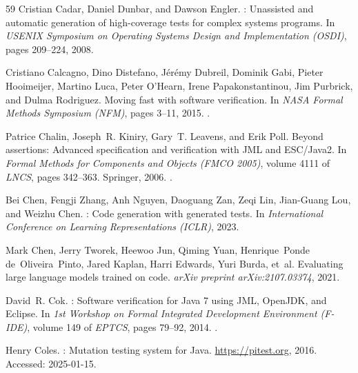 \documentclass[11pt]{article}
\begin{document}
\begin{thebibliography}{59}
Cristian Cadar, Daniel Dunbar, and Dawson Engler.
: Unassisted and automatic generation of high-coverage tests
  for complex systems programs.
\newblock In \emph{USENIX Symposium on Operating Systems Design and
  Implementation (OSDI)}, pages 209--224, 2008.

Cristiano Calcagno, Dino Distefano, J{\'e}r{\'e}my Dubreil, Dominik Gabi,
  Pieter Hooimeijer, Martino Luca, Peter O'Hearn, Irene Papakonstantinou, Jim
  Purbrick, and Dulma Rodriguez.
\newblock Moving fast with software verification.
\newblock In \emph{NASA Formal Methods Symposium (NFM)}, pages 3--11, 2015.
\newblock {}.

Patrice Chalin, Joseph~R. Kiniry, Gary~T. Leavens, and Erik Poll.
\newblock Beyond assertions: Advanced specification and verification with {JML}
  and {ESC/Java2}.
\newblock In \emph{Formal Methods for Components and Objects (FMCO 2005)},
  volume 4111 of \emph{LNCS}, pages 342--363. Springer, 2006.
\newblock {}.

Bei Chen, Fengji Zhang, Anh Nguyen, Daoguang Zan, Zeqi Lin, Jian-Guang Lou, and
  Weizhu Chen.
: Code generation with generated tests.
\newblock In \emph{International Conference on Learning Representations
  (ICLR)}, 2023.

Mark Chen, Jerry Tworek, Heewoo Jun, Qiming Yuan, Henrique~Ponde
  de~Oliveira~Pinto, Jared Kaplan, Harri Edwards, Yuri Burda, et~al.
\newblock Evaluating large language models trained on code.
\newblock \emph{arXiv preprint arXiv:2107.03374}, 2021.

David~R. Cok.
: Software verification for {Java 7} using {JML}, {OpenJDK},
  and {Eclipse}.
\newblock In \emph{1st Workshop on Formal Integrated Development Environment
  (F-IDE)}, volume 149 of \emph{EPTCS}, pages 79--92, 2014.
\newblock {}.

Henry Coles.
: Mutation testing system for {Java}.
\newblock \url{https://pitest.org}, 2016.
\newblock Accessed: 2025-01-15.


\end{thebibliography}
\end{document}
